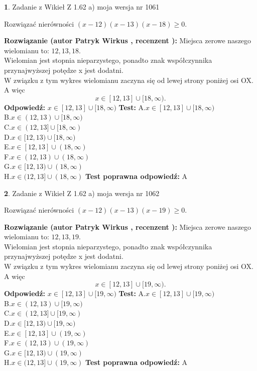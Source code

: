 \documentclass[12pt, a4paper]{article}
\theoremstyle{definition} %
\newtheorem{zad}{}
\newcommand{\zadStart}[1]{\begin{zad}#1\newline}
\newcommand{\zadStop}{\end{zad}}
\newcommand{\rozwStart}[2]{\noindent \textbf{Rozwiązanie (autor #1 , recenzent #2): }\newline}
\newcommand{\rozwStop}{\newline}
\newcommand{\odpStart}{\noindent \textbf{Odpowiedź:}\newline}
\newcommand{\odpStop}{\newline}
\newcommand{\testStart}{\noindent \textbf{Test:}\newline}
\newcommand{\testStop}{\newline}
\newcommand{\kluczStart}{\noindent \textbf{Test poprawna odpowiedź:}\newline}
\newcommand{\kluczStop}{\newline}
\begin{document}
\zadStart{Zadanie z Wikieł Z 1.62 a) moja wersja nr 1061}

Rozwiązać nierówności $(x-12)(x-13)(x-18)\ge0$.
\zadStop
\rozwStart{Patryk Wirkus}{}
Miejsca zerowe naszego wielomianu to: $12, 13, 18$.\\
Wielomian jest stopnia nieparzystego, ponadto znak współczynnika przy\linebreak najwyższej potędze x jest dodatni.\\ W związku z tym wykres wielomianu zaczyna się od lewej strony poniżej osi OX. A więc $$x \in [12,13] \cup [18,\infty).$$
\rozwStop
\odpStart
$x \in [12,13] \cup [18,\infty)$
\odpStop
\testStart
A.$x \in [12,13] \cup [18,\infty)$\\
B.$x \in (12,13) \cup [18,\infty)$\\
C.$x \in (12,13] \cup [18,\infty)$\\
D.$x \in [12,13) \cup [18,\infty)$\\
E.$x \in [12,13] \cup (18,\infty)$\\
F.$x \in (12,13) \cup (18,\infty)$\\
G.$x \in [12,13) \cup (18,\infty)$\\
H.$x \in (12,13] \cup (18,\infty)$
\testStop
\kluczStart
A
\kluczStop



\zadStart{Zadanie z Wikieł Z 1.62 a) moja wersja nr 1062}

Rozwiązać nierówności $(x-12)(x-13)(x-19)\ge0$.
\zadStop
\rozwStart{Patryk Wirkus}{}
Miejsca zerowe naszego wielomianu to: $12, 13, 19$.\\
Wielomian jest stopnia nieparzystego, ponadto znak współczynnika przy\linebreak najwyższej potędze x jest dodatni.\\ W związku z tym wykres wielomianu zaczyna się od lewej strony poniżej osi OX. A więc $$x \in [12,13] \cup [19,\infty).$$
\rozwStop
\odpStart
$x \in [12,13] \cup [19,\infty)$
\odpStop
\testStart
A.$x \in [12,13] \cup [19,\infty)$\\
B.$x \in (12,13) \cup [19,\infty)$\\
C.$x \in (12,13] \cup [19,\infty)$\\
D.$x \in [12,13) \cup [19,\infty)$\\
E.$x \in [12,13] \cup (19,\infty)$\\
F.$x \in (12,13) \cup (19,\infty)$\\
G.$x \in [12,13) \cup (19,\infty)$\\
H.$x \in (12,13] \cup (19,\infty)$
\testStop
\kluczStart
A
\kluczStop
\end{document}
